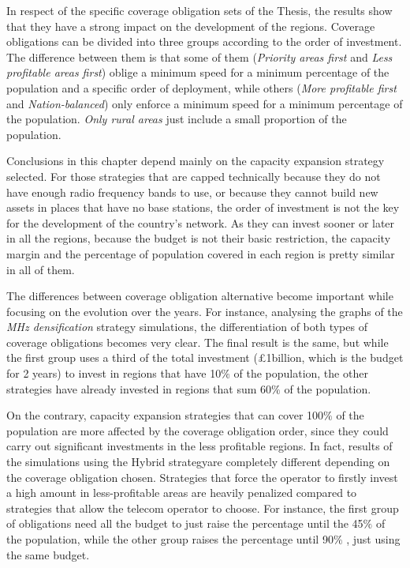 


In respect of the specific coverage obligation sets of the Thesis, the results show that they have a strong impact on the development of the regions. Coverage obligations can be divided into three groups according to the order of investment. The difference between them is that some of them (\textit{\guillemotleft Priority areas first\guillemotright } and\textit{ \guillemotleft Less profitable areas first\guillemotright }) oblige a minimum speed for a minimum percentage of the population and a specific order of deployment, while others (\textit{\guillemotleft More profitable first\guillemotright } and \textit{\guillemotleft Nation-balanced\guillemotright }) only enforce a minimum speed for a minimum percentage of the population.\textit{ \guillemotleft Only rural areas\guillemotright } just include a small proportion of the population.\par

Conclusions in this chapter depend mainly on the capacity expansion strategy selected. For those strategies that are capped technically because they do not have enough radio frequency bands to use, or because they cannot build new assets in places that have no base stations, the order of investment is not the key for the development of the country’s network. As they can invest sooner or later in all the regions, because the budget is not their basic restriction, the capacity margin and the percentage of population covered in each region is pretty similar in all of them.\par

The differences between coverage obligation alternative become important while focusing on the evolution over the years. For instance, analysing the graphs of the \textit{ MHz densification\guillemotright } strategy simulations, the differentiation of both types of coverage obligations becomes very clear. The final result is the same, but while the first group uses a third of the total investment (£1billion, which is the budget for 2 years) to invest in regions that have 10$\%$  of the population, the other strategies have already invested in regions that sum 60$\%$  of the population.\par

On the contrary, capacity expansion strategies that can cover 100$\%$  of the population are more affected by the coverage obligation order, since they could carry out significant investments in the less profitable regions. In fact, results of the simulations using the \guillemotleft Hybrid strategy\guillemotright  are completely different depending on the coverage obligation chosen. Strategies that force the operator to firstly invest a high amount in less-profitable areas are heavily penalized compared to strategies that allow the telecom operator to choose. For instance, the first group of obligations need all the budget to just raise the percentage until the 45$\%$  of the population, while the other group raises the percentage until 90$\%$ , just using the same budget. \par

